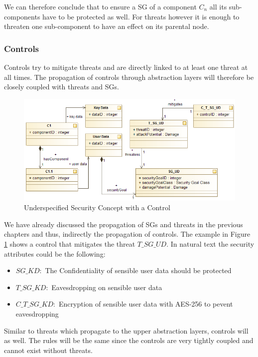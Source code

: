 We can therefore conclude that to ensure a SG of a component $C_n$ all its sub-components have to be protected as well. For threats however it is enough to threaten one sub-component to have an effect on its parental node.

\subsubsection*{Controls}

Controls try to mitigate threats and are directly linked to at least one threat at all times. The propagation of controls through abstraction layers will therefore be closely coupled with threats and SGs.

\begin{figure}[H]
\centering
\includegraphics[width=\textwidth]{pictures/control_propagation.png}
\caption{Underspecified Security Concept with a Control}
\label{fig:control_propagation}
\end{figure} 

We have already discussed the propagation of SGs and threats in the previous chapters and thus, indirectly the propagation of controls. The example in Figure \ref{fig:control_propagation} shows a control that mitigates the threat $T\_SG\_UD$. In natural text the security attributes could be the following:

\begin{itemize}
\item[]\textbf{$SG\_KD:$} The Confidentiality of sensible user data should be protected
\item[]\textbf{$T\_SG\_KD:$} Eavesdropping on sensible user data
\item[]\textbf{$C\_T\_SG\_KD:$} Encryption of sensible user data with AES-256 to pevent eavesdropping
\end{itemize}

Similar to threats which propagate to the upper abstraction layers, controls will as well. The rules will be the same since the controls are very tightly coupled and cannot exist without threats.


